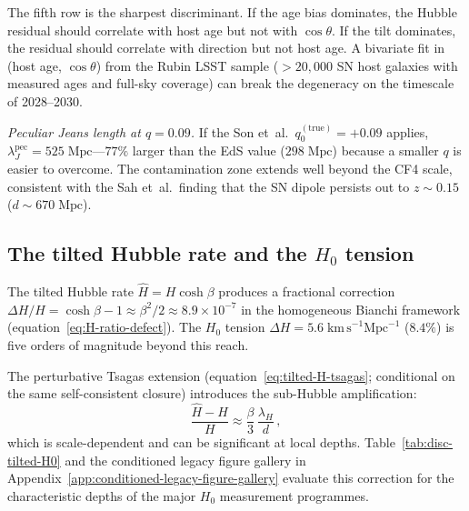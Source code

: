 The fifth row is the sharpest discriminant.  If the age bias
dominates, the Hubble residual should correlate with host age
but not with $\cos\theta$.  If the tilt dominates, the residual
should correlate with direction but not host age.  A bivariate
fit in (host age, $\cos\theta$) from the Rubin LSST sample
($>20{,}000$ SN host galaxies with measured ages and full-sky
coverage) can break the degeneracy on the timescale of 2028--2030.

\emph{Peculiar Jeans length at $q = 0.09$.}
If the Son et~al.\ $q_0^{(\mathrm{true})} = +0.09$ applies,
$\lambda_J^{\mathrm{pec}} = 525\;\mathrm{Mpc}$---$77\%$ larger
than the EdS value ($298\;\mathrm{Mpc}$) because a smaller
$q$ is easier to overcome.  The contamination zone extends well
beyond the CF4 scale, consistent with the Sah et~al.\ finding
that the SN dipole persists out to $z \sim 0.15$
($d \sim 670\;\mathrm{Mpc}$).


\subsection{The tilted Hubble rate and the $H_0$ tension}
\label{sec:disc-tilted-H0}

The tilted Hubble rate $\hat{H} = H\cosh\beta$ produces a
fractional correction $\Delta H/H = \cosh\beta - 1 \approx
\beta^2/2 \approx 8.9 \times 10^{-7}$ in the homogeneous Bianchi
framework (equation~\eqref{eq:H-ratio-defect}).  The $H_0$ tension
$\Delta H = 5.6\;\mathrm{km\,s}^{-1}\mathrm{Mpc}^{-1}$
($8.4\%$) is five orders of magnitude beyond this reach.

The perturbative Tsagas extension
(equation~\eqref{eq:tilted-H-tsagas}; conditional on the
same self-consistent closure) introduces the sub-Hubble
amplification:
\begin{equation}\label{eq:disc-dH}
\frac{\hat{H} - H}{H}
\approx \frac{\beta}{3}\,\frac{\lambda_H}{d}\,,
\end{equation}
which is scale-dependent and can be significant at local depths.
Table~\ref{tab:disc-tilted-H0} and the conditioned legacy figure gallery in Appendix~\ref{app:conditioned-legacy-figure-gallery} evaluate this correction for
the characteristic depths of the major $H_0$ measurement
programmes.


